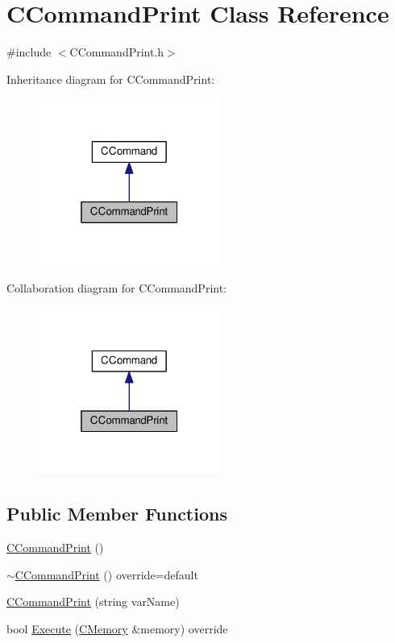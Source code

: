 \hypertarget{classCCommandPrint}{}\section{C\+Command\+Print Class Reference}
\label{classCCommandPrint}


{\ttfamily \#include $<$C\+Command\+Print.\+h$>$}



Inheritance diagram for C\+Command\+Print\+:\nopagebreak
\begin{figure}[H]
\begin{center}
\leavevmode
\includegraphics[width=169pt]{classCCommandPrint__inherit__graph}
\end{center}
\end{figure}


Collaboration diagram for C\+Command\+Print\+:\nopagebreak
\begin{figure}[H]
\begin{center}
\leavevmode
\includegraphics[width=169pt]{classCCommandPrint__coll__graph}
\end{center}
\end{figure}
\subsection*{Public Member Functions}
\begin{DoxyCompactItemize}
\item 
\hyperlink{classCCommandPrint_a3ac2095924e3b2762767d9c58a7b4718}{C\+Command\+Print} ()
\item 
\hyperlink{classCCommandPrint_add53990e292eda4fcc0908791f864ebe}{$\sim$\+C\+Command\+Print} () override=default
\item 
\hyperlink{classCCommandPrint_a064d571e6454d64271108fc9d188926e}{C\+Command\+Print} (string var\+Name)
\item 
bool \hyperlink{classCCommandPrint_afa1b192d43baa81c5ea9884972366643}{Execute} (\hyperlink{classCMemory}{C\+Memory} \&memory) override
\end{DoxyCompactItemize}
